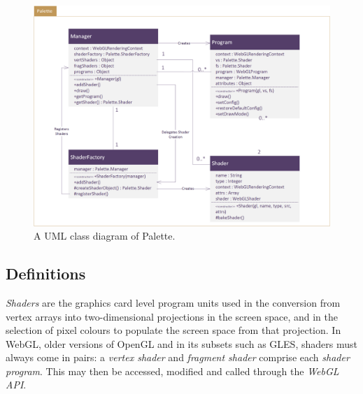 \documentclass{l3proj}
\begin{document}
\begin{figure}[!h]
\centering
\includegraphics[width=\textwidth]{images/Palette-UML}
\caption{A UML class diagram of Palette.}
\label{fig:palette-uml}
\end{figure}

\subsection{Definitions}
\label{arch-shad-def}
\textit{Shaders} are the graphics card level program units used in the conversion from vertex arrays into two-dimensional projections in the screen space, and in the selection of pixel colours to populate the screen space from that projection. In WebGL, older versions of OpenGL and in its subsets such as GLES, shaders must always come in pairs: a \textit{vertex shader} and \textit{fragment shader} comprise each \textit{shader program}. This may then be accessed, modified and called through the \textit{WebGL API}.
\end{document}

